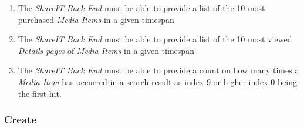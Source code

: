 \documentclass[../report.tex]{subfiles}
\begin{document}
\begin{enumerate}[label=\textbf{FR-\twodigits*}]
\item The \textit{ShareIT Back End} must be able to provide a list of the 10 most purchased \textit{Media Items} in a given timespan

\item The \textit{ShareIT Back End} must be able to provide a list of the 10 most viewed \textit{Details page}s of \textit{Media Items} in a given timespan

\item The \textit{ShareIT Back End} must be able to provide a count on how many times a \textit{Media Item} has occurred in a search result as index 9 or higher index 0 being the first hit. 

\end{enumerate}

\subsubsection{Create}
\end{document}
